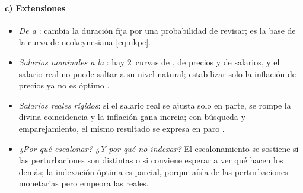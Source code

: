 \documentclass[11pt]{article}
\begin{document}
\paragraph{c) Extensiones}
\begin{itemize}
\item \emph{De  a }: \textcite{Calvo1983Staggered} cambia la duración fija por una probabilidad de revisar; es la base de la curva de  neokeynesiana \eqref{eq:nkpc}.
\item \emph{Salarios nominales a la }: hay 2~curvas de , de precios y de salarios, y el salario real no puede saltar a su nivel natural; estabilizar solo la inflación de precios ya no es óptimo\nocite{ErcegHendersonLevin2000Optimal} .
\item \emph{Salarios reales rígidos}: si el salario real se ajusta solo en parte, se rompe la divina coincidencia y la inflación gana inercia\nocite{BlanchardGali2007Real}; con búsqueda y emparejamiento, el mismo resultado se expresa en paro\nocite{BlanchardGali2010Labor}  .
\item \emph{¿Por qué escalonar? ¿Y por qué no indexar?} El escalonamiento se sostiene si las perturbaciones son distintas o si conviene esperar a ver qué hacen los demás\nocite{BallRomer1989Timing,BallCecchetti1988}; la indexación óptima es parcial, porque aísla de las perturbaciones monetarias pero empeora las reales\nocite{Gray1976Wage}.
\end{itemize}
\end{document}
